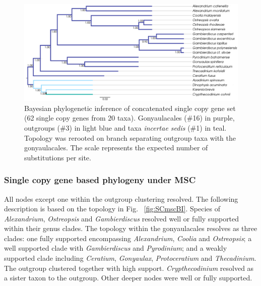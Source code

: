 \documentclass[12pt]{article}
\begin{document}
\begin{figure} 
\includegraphics[scale=.34]{figures/SC-concat-BI.png} 
\caption{Bayesian phylogenetic inference of concatenated single copy gene set (62 single copy genes from 20 taxa). Gonyaulacales (\#16) in purple, outgroups (\#3) in light blue and taxa \textit{incertae sedis} (\#1) in teal. Topology was rerooted on branch separating outgroup taxa with the gonyaulacales. The scale represents the expected number of substitutions per site.} 
\label{fig:SCconcatBI}
\end{figure} 
\FloatBarrier

\subsubsection{Single copy gene based phylogeny under MSC}
\FloatBarrier 
All nodes except one within the outgroup clustering resolved.
The following description is based on the topology in Fig. ~\ref{fig:SCmscBI}. 
Species of \emph{Alexandrium}, \emph{Ostreopsis} and \emph{Gambierdiscus} resolved well or fully supported within their genus clades. 
The topology within the gonyaulacales resolves as three clades: 
one fully supported encompassing \emph{Alexandrium}, \emph{Coolia} and \emph{Ostreopsis};
a well supported clade with \emph{Gambierdiscus} and \emph{Pyrodinium}; 
and a weakly supported clade including \emph{Ceratium}, \emph{Gonyaulax}, \emph{Protoceratium} and \emph{Thecadinium}. 
The outgroup clustered together with high support. 
\emph{Crypthecodinium} resolved as a sister taxon to the outgroup. 
Other deeper nodes were well or fully supported.
\end{document}
